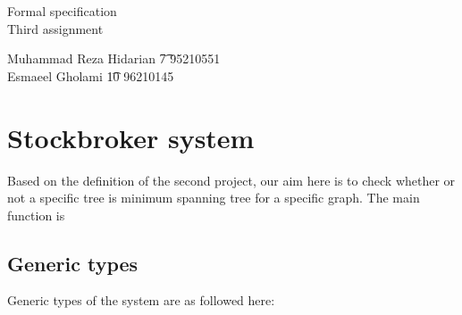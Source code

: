 \documentclass{article}
\begin{document}
\begin{center}
\begin{Huge}
Formal specification \\

{\huge Third assignment\\}
\end{Huge}
\begin{large}
\begin{flushleft}
Muhammad Reza Hidarian \t7 95210551
\\Esmaeel Gholami \t10 96210145
\end{flushleft}	
\end{large}\end{center}

\section{Stockbroker system}

Based on the definition of the second project, our aim here is to check whether or not a specific tree is minimum spanning tree for a specific graph. The main function is 

\subsection*{Generic types}
Generic types of the system are as followed here:
\begin{zed}
  [char]
\end{zed}
\end{document}
